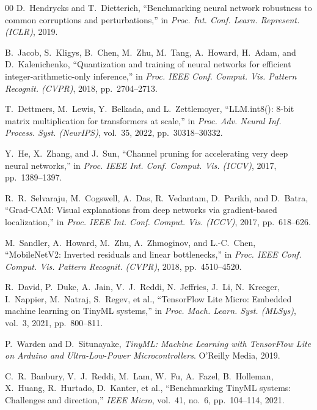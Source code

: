 \documentclass[conference]{IEEEtran}
\begin{document}
\begin{thebibliography}{00}
D.~Hendrycks and T.~Dietterich, ``Benchmarking neural network robustness to common corruptions and perturbations,'' in \textit{Proc. Int. Conf. Learn. Represent. (ICLR)}, 2019.

B.~Jacob, S.~Kligys, B.~Chen, M.~Zhu, M.~Tang, A.~Howard, H.~Adam, and D.~Kalenichenko, ``Quantization and training of neural networks for efficient integer-arithmetic-only inference,'' in \textit{Proc. IEEE Conf. Comput. Vis. Pattern Recognit. (CVPR)}, 2018, pp.~2704--2713.

T.~Dettmers, M.~Lewis, Y.~Belkada, and L.~Zettlemoyer, ``LLM.int8(): 8-bit matrix multiplication for transformers at scale,'' in \textit{Proc. Adv. Neural Inf. Process. Syst. (NeurIPS)}, vol.~35, 2022, pp.~30318--30332.

Y.~He, X.~Zhang, and J.~Sun, ``Channel pruning for accelerating very deep neural networks,'' in \textit{Proc. IEEE Int. Conf. Comput. Vis. (ICCV)}, 2017, pp.~1389--1397.

R.~R.~Selvaraju, M.~Cogswell, A.~Das, R.~Vedantam, D.~Parikh, and D.~Batra, ``Grad-CAM: Visual explanations from deep networks via gradient-based localization,'' in \textit{Proc. IEEE Int. Conf. Comput. Vis. (ICCV)}, 2017, pp.~618--626.

M.~Sandler, A.~Howard, M.~Zhu, A.~Zhmoginov, and L.-C.~Chen, ``MobileNetV2: Inverted residuals and linear bottlenecks,'' in \textit{Proc. IEEE Conf. Comput. Vis. Pattern Recognit. (CVPR)}, 2018, pp.~4510--4520.

R.~David, P.~Duke, A.~Jain, V.~J.~Reddi, N.~Jeffries, J.~Li, N.~Kreeger, I.~Nappier, M.~Natraj, S.~Regev, et al., ``TensorFlow Lite Micro: Embedded machine learning on TinyML systems,'' in \textit{Proc. Mach. Learn. Syst. (MLSys)}, vol.~3, 2021, pp.~800--811.

P.~Warden and D.~Situnayake, \textit{TinyML: Machine Learning with TensorFlow Lite on Arduino and Ultra-Low-Power Microcontrollers}. O'Reilly Media, 2019.

C.~R.~Banbury, V.~J.~Reddi, M.~Lam, W.~Fu, A.~Fazel, B.~Holleman, X.~Huang, R.~Hurtado, D.~Kanter, et al., ``Benchmarking TinyML systems: Challenges and direction,'' \textit{IEEE Micro}, vol.~41, no.~6, pp.~104--114, 2021.

\end{thebibliography}
\end{document}
